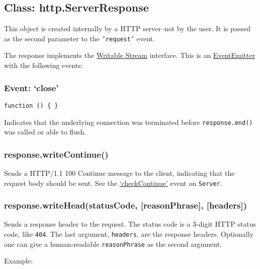 \subsection{Class: http.ServerResponse}

This object is created internally by a HTTP server--not by the user. It
is passed as the second parameter to the \texttt{'request'} event.

The response implements the
\href{stream.html\#stream\_writable\_stream}{Writable Stream} interface.
This is an
\href{events.html\#events\_class\_events\_eventemitter}{EventEmitter}
with the following events:

\subsubsection{Event: `close'}

\texttt{function () \{ \}}

Indicates that the underlying connection was terminated before
\texttt{response.end()} was called or able to flush.

\subsubsection{response.writeContinue()}

Sends a HTTP/1.1 100 Continue message to the client, indicating that the
request body should be sent. See the
\hyperref[http\_event\_checkcontinue]{`checkContinue'} event on
\texttt{Server}.

\subsubsection{response.writeHead(statusCode, {[}reasonPhrase{]},
{[}headers{]})}

Sends a response header to the request. The status code is a 3-digit
HTTP status code, like \texttt{404}. The last argument,
\texttt{headers}, are the response headers. Optionally one can give a
human-readable \texttt{reasonPhrase} as the second argument.

Example:

\begin{Shaded}
\begin{Highlighting}[]
 \NormalTok{;}
\NormalTok{(}\NormalTok{, \{}
  \NormalTok{: }\NormalTok{,}
  \NormalTok{: } \NormalTok{\});}
\end{Highlighting}
\end{Shaded}

